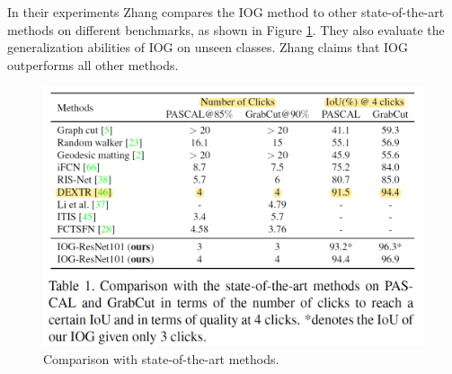 In their experiments Zhang compares the IOG method to other state-of-the-art methods on different benchmarks, as shown in Figure \ref{fig:ch3:sec1:comparison}.
They also evaluate the generalization abilities of IOG on unseen classes.
Zhang claims that IOG outperforms all other methods.
\begin{figure}
	\includegraphics[width=\linewidth]{figures/chap31_comparison.png}
	\caption{Comparison with state-of-the-art methods.}
	\label{fig:ch3:sec1:comparison}
\end{figure}
